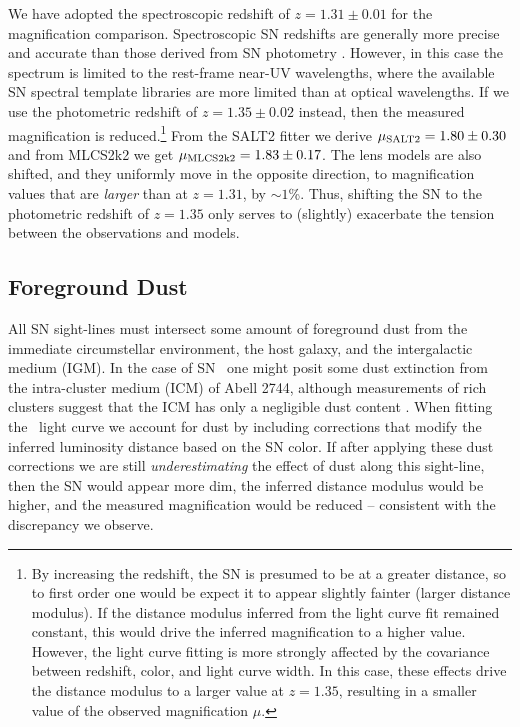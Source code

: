 We have adopted the spectroscopic redshift of $z=1.31\pm0.01$ for the
magnification comparison.  Spectroscopic SN redshifts are generally more
precise and accurate than those derived from SN
photometry \citep{Rodney:2010b,Kessler:2010,Sako:2011}.  However, in
this case the spectrum is limited to the rest-frame near-UV
wavelengths, where the available SN spectral template libraries are
more limited than at optical wavelengths.  If we use the photometric
redshift of $z=1.35\pm0.02$ instead, then the measured magnification
is reduced.\footnote{By increasing the redshift, the SN is presumed to
be at a greater distance, so to first order one would be expect it to
appear slightly fainter (larger distance modulus). If the distance
modulus inferred from the light curve fit remained constant, this
would drive the inferred magnification to a higher value.  However,
the light curve fitting is more strongly affected by the covariance
between redshift, color, and light curve width.  In this case, these
effects drive the distance modulus to a larger value at $z=1.35$,
resulting in a smaller value of the observed magnification $\mu$.}
From the SALT2 fitter we derive $\mu_{\rm SALT2}=1.80\pm0.30$ and from
MLCS2k2 we get $\mu_{\rm MLCS2k2}=1.83\pm0.17$.  The lens models are
also shifted, and they uniformly move in the opposite direction, to
magnification values that are {\it larger} than at $z=1.31$, by
$\sim1$\%.  Thus, shifting the SN to the photometric redshift of
$z=1.35$ only serves to (slightly) exacerbate the tension between the
observations and models. 


\subsection{Foreground Dust}
\label{sec:ForegroundDust}

All SN sight-lines must intersect some amount of foreground dust from
the immediate circumstellar environment, the host galaxy, and the
intergalactic medium (IGM). In the case of SN \tomas\ one might posit
some dust extinction from the intra-cluster medium (ICM) of Abell
2744, although measurements of rich clusters suggest that the ICM has
only a negligible dust
content \citep{Maoz:1995,Stickel:2002,Bai:2007}.  When fitting
the \tomas\ light curve we account for dust by including corrections
that modify the inferred luminosity distance based on the SN color.
If after applying these dust corrections we are still {\it
underestimating} the effect of dust along this sight-line, then the SN
would appear more dim, the inferred distance modulus would be higher,
and the measured magnification would be reduced -- consistent with the
discrepancy we observe.  

